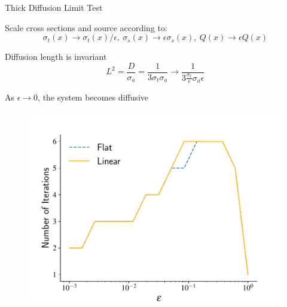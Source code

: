 \documentclass[10pt]{beamer}
\begin{document}
\begin{frame}{Thick Diffusion Limit Test}

	Scale cross sections and source according to:
	\begin{equation*}
		\sigma_t(x) \rightarrow \sigma_t(x)/\epsilon, \
		\sigma_s(x) \rightarrow \epsilon \sigma_s(x), \
		Q(x) \rightarrow \epsilon Q(x)
	\end{equation*}

	Diffusion length is invariant 
	\begin{equation*}
		L^2 = \frac{D}{\sigma_a} = \frac{1}{3\sigma_t\sigma_a} \rightarrow
			\frac{1}{3 \frac{\sigma_t}{\epsilon} \sigma_a \epsilon}
	\end{equation*}

	As $\epsilon \rightarrow 0$, the system becomes diffusive 

	\vspace{-.2in}
	\begin{figure}[htb]
		\centering
		\includegraphics[height=.55\textheight]{figs/dl_it.pdf}
		\label{fig:dl_it}
	\end{figure}

\end{frame}
\end{document}
